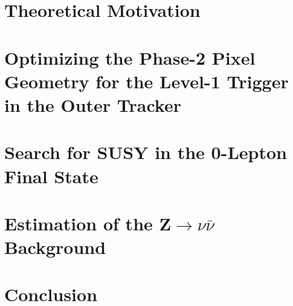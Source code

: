 \documentclass[12pt,twoside,openany]{book}
\begin{document}
\chapter{Theoretical Motivation}\label{theory}


\chapter{Optimizing the Phase-2 Pixel Geometry for the Level-1 Trigger in the Outer Tracker}\label{stubs}


\chapter{Search for SUSY in the 0-Lepton Final State}\label{AnalysisChap}


\chapter{Estimation of the Z$\rightarrow \nu\bar{\nu}$ Background}\label{estimation}


\chapter{Conclusion}\label{conclusion}


\appendix
%

{}

\end{document}
